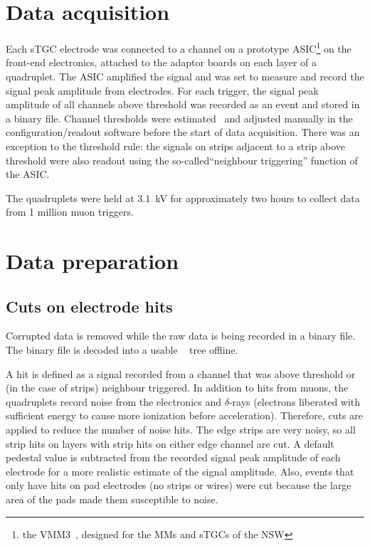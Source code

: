 \section{Data acquisition}
Each sTGC electrode was connected to a channel on a prototype ASIC\footnote{the VMM3~\cite{iakovidis_vmm3_2017}, designed for the MMs and sTGCs of the NSW} on the front-end electronics, attached to the adaptor boards on each layer of a quadruplet.  The ASIC amplified the signal and was set to measure and record the signal peak amplitude from electrodes. For each trigger, the signal peak amplitude of all channels above threshold was recorded as an event and stored in a binary file. Channel thresholds were estimated~\cite{chen_calibration_2019} and adjusted manually in the configuration/readout software before the start of data acquisition. There was an exception to the threshold rule: the signals on strips adjacent to a strip above threshold were also readout using the so-called``neighbour triggering'' function of the ASIC. 

The quadruplets were held at 3.1~kV for approximately two hours to collect data from 1 million muon triggers.

\section{Data preparation}
\subsection{Cuts on electrode hits}
Corrupted data is removed while the raw data is being recorded in a binary file. The binary file is decoded into a usable ~\cite{ROOT_paper} tree offline. 

A hit is defined as a signal recorded from a channel that was above threshold or (in the case of strips) neighbour triggered. In addition to hits from muons, the quadruplets record noise from the electronics and $\delta$-rays (electrons liberated with sufficient energy to cause more ionization before acceleration). Therefore, cuts are applied to reduce the number of noise hits. The edge strips are very noisy, so all strip hits on layers with strip hits on either edge channel are cut. A default pedestal value is subtracted from the recorded signal peak amplitude of each electrode for a more realistic estimate of the signal amplitude. Also, events that only have hits on pad electrodes (no strips or wires) were cut because the large area of the pads made them susceptible to noise.

